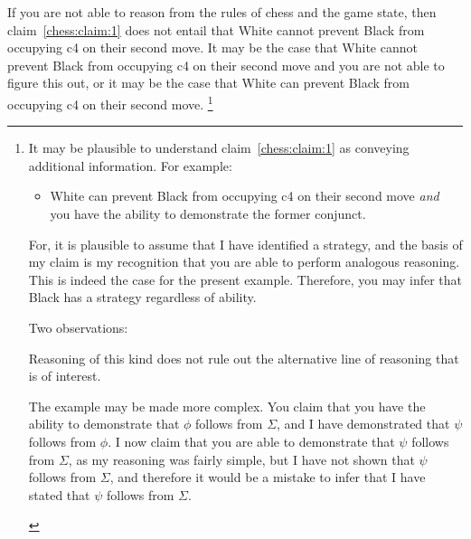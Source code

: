 \documentclass[10pt]{article}
\begin{document}
If you are not able to reason from the rules of chess and the game state, then claim~\ref{chess:claim:1} does not entail that White cannot prevent Black from occupying c4 on their second move.
It may be the case that White cannot prevent Black from occupying c4 on their second move and you are not able to figure this out, or it may be the case that White can prevent Black from occupying c4 on their second move.\nolinebreak
\footnote{
  It may be plausible to understand claim~\ref{chess:claim:1} as conveying additional information.
  For example:
  \begin{itemize}
  \item White can prevent Black from occupying c4 on their second move \emph{and} you have the ability to demonstrate the former conjunct.
  \end{itemize}
  For, it is plausible to assume that I have identified a strategy, and the basis of my claim is my recognition that you are able to perform analogous reasoning.
  This is indeed the case for the present example.
  Therefore, you may infer that Black has a strategy regardless of ability.

  Two observations:
  \begin{enumerate*}[label=(\roman*)]
  \item Reasoning of this kind does not rule out the alternative line of reasoning that is of interest.
  \item The example may be made more complex. You claim that you have the ability to demonstrate that \(\phi\) follows from \(\Sigma\), and I have demonstrated that \(\psi\) follows from \(\phi\). I now claim that you are able to demonstrate that \(\psi\) follows from \(\Sigma\), as my reasoning was fairly simple, but I have not shown that \(\psi\) follows from \(\Sigma\), and therefore it would be a mistake to infer that I have stated that \(\psi\) follows from \(\Sigma\).
  \end{enumerate*}

}
\end{document}
